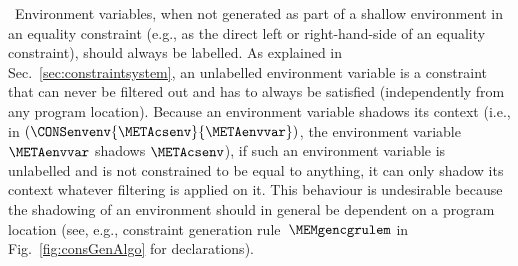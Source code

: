 \documentclass{jfp1}
\begin{document}
\principleG\ Environment variables, when not generated as part of a
shallow environment in an equality constraint (e.g., as the direct
left or right-hand-side of an equality constraint), should always be
labelled.
%
As explained in Sec.~\ref{sec:constraintsystem}, an unlabelled
environment variable is a constraint that can never be filtered out
and has to always be satisfied (independently from any program
location).  Because an environment variable shadows its context (i.e.,
in $(\CONSenvenv{\METAcsenv}{\METAenvvar})$, the environment variable
$\METAenvvar$ shadows $\METAcsenv$), if such an environment variable
is unlabelled and is not constrained to be equal to anything, it can
only shadow its context whatever filtering is applied on it.  This
behaviour is undesirable because the shadowing of an environment
should in general be dependent on a program location (see, e.g.,
constraint generation rule~$\MEMgencgrulem$ in
Fig.~\ref{fig:consGenAlgo} for  declarations).
%
\end{document}
